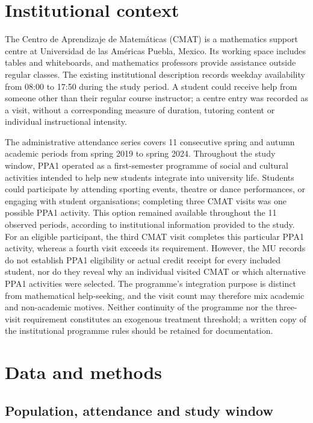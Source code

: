 \section{Institutional context}

The Centro de Aprendizaje de Matem\'aticas (CMAT) is a mathematics support centre at Universidad de las Am\'ericas Puebla, Mexico. Its working space includes tables and whiteboards, and mathematics professors provide assistance outside regular classes. The existing institutional description records weekday availability from 08:00 to 17:50 during the study period. A student could receive help from someone other than their regular course instructor; a centre entry was recorded as a visit, without a corresponding measure of duration, tutoring content or individual instructional intensity.

The administrative attendance series covers 11 consecutive spring and autumn academic periods from spring 2019 to spring 2024. Throughout the study window, PPA1 operated as a first-semester programme of social and cultural activities intended to help new students integrate into university life. Students could participate by attending sporting events, theatre or dance performances, or engaging with student organisations; completing three CMAT visits was one possible PPA1 activity. This option remained available throughout the 11 observed periods, according to institutional information provided to the study. For an eligible participant, the third CMAT visit completes this particular PPA1 activity, whereas a fourth visit exceeds its requirement. However, the MU records do not establish PPA1 eligibility or actual credit receipt for every included student, nor do they reveal why an individual visited CMAT or which alternative PPA1 activities were selected. The programme's integration purpose is distinct from mathematical help-seeking, and the visit count may therefore mix academic and non-academic motives. Neither continuity of the programme nor the three-visit requirement constitutes an exogenous treatment threshold; a written copy of the institutional programme rules should be retained for documentation.

\section{Data and methods}

\subsection{Population, attendance and study window}

